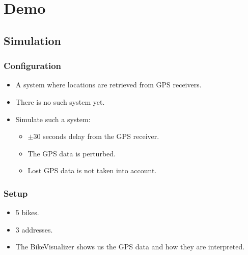 \section{Demo}
\subsection{Simulation}

\begin{frame}
\frametitle{Configuration}
\begin{itemize}
\item A system where locations are retrieved from GPS receivers.
\item There is no such system yet.
\item Simulate such a system:
\begin{itemize}
\item $\pm$30 seconds delay from the GPS receiver.
\item The GPS data is perturbed.
\item Lost GPS data is not taken into account.
\end{itemize}
\end{itemize}
\end{frame}

\begin{frame}
\frametitle{Setup}
\begin{itemize}
\item 5 bikes.
\item 3 addresses.
\item The BikeVisualizer shows us the GPS data and how they are interpreted.
\end{itemize}
\end{frame}


